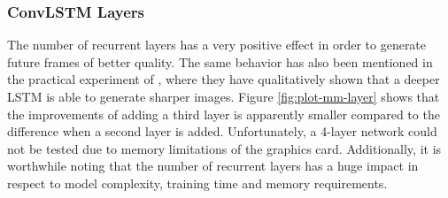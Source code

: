 \subsubsection*{ConvLSTM Layers}

The number of recurrent layers has a very positive effect in order to generate future frames of better quality. The same behavior has also been mentioned in the practical experiment of \parencite[p. 6]{unsup_learn_lstm}, where they have qualitatively shown that a deeper LSTM is able to generate sharper images. Figure \ref{fig:plot-mm-layer} shows that the improvements of adding a third layer is apparently smaller compared to the difference when a second layer is added. Unfortunately, a 4-layer network could not be tested due to memory limitations of the graphics card. Additionally, it is worthwhile noting that the number of recurrent layers has a huge impact in respect to model complexity, training time and memory requirements.

